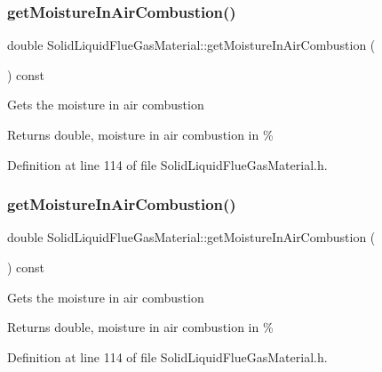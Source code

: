 \subsubsection{\texorpdfstring{get\+Moisture\+In\+Air\+Combustion()}{getMoistureInAirCombustion()}\hspace{0.1cm}{\footnotesize\ttfamily [1/3]}}
{\footnotesize\ttfamily double Solid\+Liquid\+Flue\+Gas\+Material\+::get\+Moisture\+In\+Air\+Combustion (\begin{DoxyParamCaption}{ }\end{DoxyParamCaption}) const\hspace{0.3cm}{\ttfamily [inline]}}

Gets the moisture in air combustion \begin{DoxyReturn}{Returns}
double, moisture in air combustion in \% 
\end{DoxyReturn}


Definition at line 114 of file Solid\+Liquid\+Flue\+Gas\+Material.\+h.

\mbox{\label{class_solid_liquid_flue_gas_material_ae3d9780851b8217ed2885753f11ec18b}} 
\subsubsection{\texorpdfstring{get\+Moisture\+In\+Air\+Combustion()}{getMoistureInAirCombustion()}\hspace{0.1cm}{\footnotesize\ttfamily [2/3]}}
{\footnotesize\ttfamily double Solid\+Liquid\+Flue\+Gas\+Material\+::get\+Moisture\+In\+Air\+Combustion (\begin{DoxyParamCaption}{ }\end{DoxyParamCaption}) const\hspace{0.3cm}{\ttfamily [inline]}}

Gets the moisture in air combustion \begin{DoxyReturn}{Returns}
double, moisture in air combustion in \% 
\end{DoxyReturn}


Definition at line 114 of file Solid\+Liquid\+Flue\+Gas\+Material.\+h.

\mbox{\label{class_solid_liquid_flue_gas_material_ae3d9780851b8217ed2885753f11ec18b}} 
